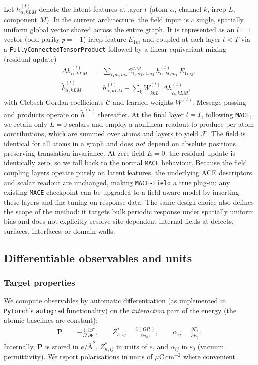 \documentclass[aps,physrev,graphicx,amsmath,amssymb,
               reprint,superscriptaddress]{revtex4-2}
\begin{document}
Let $h^{(t)}_{\alpha,kLM}$ denote the latent features at layer $t$ (atom $\alpha$, channel $k$, irrep $L$, component $M$). In the current architecture, the field input is a single, spatially uniform global vector shared across the entire graph. It is represented as an $l{=}1$ vector (odd parity $p=-1$) irrep feature $E_{1m}$ and coupled at each layer $t<T$ via a \texttt{FullyConnectedTensorProduct} followed by a linear equivariant mixing (residual update)
\begin{align}
\Delta h^{(t)}_{\alpha,kLM}
&= \sum_{l_1 m_1 m_2}
\mathcal C^{LM}_{l_1 m_1,\,1 m_2}\,
h^{(t)}_{\alpha,k l_1 m_1}\,E_{1 m_2},\nonumber\\
\tilde h^{(t)}_{\alpha,kLM}
&= h^{(t)}_{\alpha,kLM} - \sum_{\tilde k} W^{(t)}_{k\tilde k L}\,\Delta h^{(t)}_{\alpha,\tilde k LM},
\label{eq:meth_latent}
\end{align}
with Clebsch-Gordan coefficients $\mathcal C$ and learned weights $W^{(t)}$.
Message passing and products operate on $\tilde h^{(t)}$ thereafter.
At the final layer $t{=}T$, following \texttt{MACE}, we retain only $L{=}0$ scalars and employ a nonlinear readout to produce per-atom contributions, which are summed over atoms and layers to yield $\mathcal F$.
The field is identical for all atoms in a graph and does \emph{not} depend on absolute positions, preserving translation invariance. At zero field $E=0$, the residual update is identically zero, so we fall back to the normal \texttt{MACE} behaviour. Because the field coupling layers operate purely on latent features, the underlying ACE descriptors and scalar readout are unchanged, making \texttt{MACE-Field} a true plug-in: any existing \texttt{MACE} checkpoint can be upgraded to a field-aware model by inserting these layers and fine-tuning on response data. The same design choice also defines the scope of the method: it targets bulk periodic response under spatially uniform bias and does not explicitly resolve site-dependent internal fields at defects, surfaces, interfaces, or domain walls.

\subsection{Differentiable observables and units}

\subsubsection{Target properties}

We compute observables by automatic differentiation (as implemented in \texttt{PyTorch}'s \texttt{autograd} functionality) on the \emph{interaction} part of the energy (the atomic baselines are constant):
\begin{align}
\mathbf P &= - \frac{1}{\Omega} \frac{\partial \mathcal F}{\partial \mathbf E}, \qquad
Z^*_{\kappa,ij} = \frac{\partial(\Omega P_i)}{\partial u_{\kappa j}},\qquad
\alpha_{ij} = \frac{\partial P_i}{\partial E_j}.
\label{eq:meth_derivs}
\end{align}
Internally, $\mathbf P$ is stored in $e/\text{\AA}^2$, $Z^*_{\kappa,ij}$ in units of $e$, and $\alpha_{ij}$ in $\varepsilon_0$ (vacuum permittivity). We report polarisations in units of $\mu$C\,cm$^{-2}$ where convenient.
\end{document}
